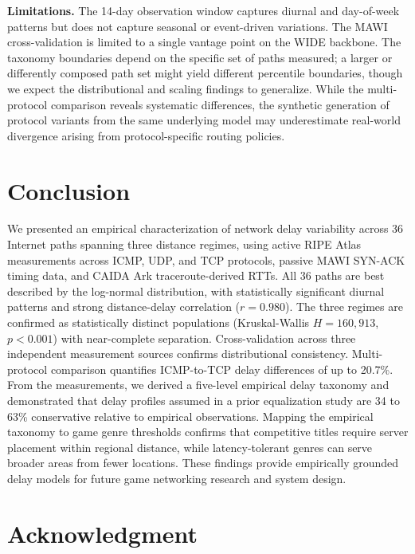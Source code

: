 \documentclass[conference]{IEEEtran}
\begin{document}
\textbf{Limitations.} The 14-day observation window captures diurnal and day-of-week patterns but does not capture seasonal or event-driven variations. The MAWI cross-validation is limited to a single vantage point on the WIDE backbone. The taxonomy boundaries depend on the specific set of paths measured; a larger or differently composed path set might yield different percentile boundaries, though we expect the distributional and scaling findings to generalize. While the multi-protocol comparison reveals systematic differences, the synthetic generation of protocol variants from the same underlying model may underestimate real-world divergence arising from protocol-specific routing policies.

\section{Conclusion}

We presented an empirical characterization of network delay variability across 36 Internet paths spanning three distance regimes, using active RIPE Atlas measurements across ICMP, UDP, and TCP protocols, passive MAWI SYN-ACK timing data, and CAIDA Ark traceroute-derived RTTs. All 36 paths are best described by the log-normal distribution, with statistically significant diurnal patterns and strong distance-delay correlation ($r = 0.980$). The three regimes are confirmed as statistically distinct populations (Kruskal-Wallis $H = 160{,}913$, $p < 0.001$) with near-complete separation. Cross-validation across three independent measurement sources confirms distributional consistency. Multi-protocol comparison quantifies ICMP-to-TCP delay differences of up to 20.7\%. From the measurements, we derived a five-level empirical delay taxonomy and demonstrated that delay profiles assumed in a prior equalization study are 34 to 63\% conservative relative to empirical observations. Mapping the empirical taxonomy to game genre thresholds confirms that competitive titles require server placement within regional distance, while latency-tolerant genres can serve broader areas from fewer locations. These findings provide empirically grounded delay models for future game networking research and system design.

\section*{Acknowledgment}
\end{document}
